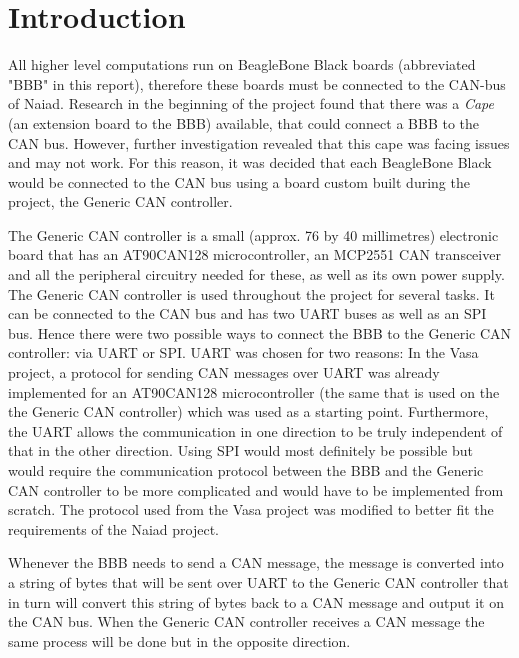 
\section{Introduction}\label{sec:introduction}
All higher level computations run on BeagleBone Black boards (abbreviated "BBB" in this report), therefore these boards must be connected to the CAN-bus of Naiad. Research in the beginning of the project found that there was a \emph{Cape} (an extension board to the BBB) available, that could connect a BBB to the CAN bus. However, further investigation revealed that this cape was facing issues and may not work. For this reason, it was decided that each BeagleBone Black would be connected to the CAN bus using a board custom built during the project, the Generic CAN controller. \newline

The Generic CAN controller is a small (approx. 76 by 40 millimetres) electronic board that has an AT90CAN128 microcontroller, an MCP2551 CAN transceiver and all the peripheral circuitry needed for these, as well as its own power supply. The Generic CAN controller is used throughout the project for several tasks. It can be connected to the CAN bus and has two UART buses as well as an SPI bus. \newline
Hence there were two possible ways to connect the BBB to the Generic CAN controller: via UART or SPI. \newline
UART was chosen for two reasons: In the Vasa project, a protocol for sending CAN messages over UART was already implemented for an AT90CAN128 microcontroller (the same that is used on the the Generic CAN controller) which was used as a starting point. Furthermore, the UART allows the communication in one direction to be truly independent of that in the other direction. Using SPI would most definitely be possible but would require the communication protocol between the BBB and the Generic CAN controller to be more complicated and would have to be implemented from scratch.  \newline
The protocol used from the Vasa project was modified to better fit the requirements of the Naiad project.

Whenever the BBB needs to send a CAN message, the message is converted into a string of bytes that will be sent over UART to the Generic CAN controller that in turn will convert this string of bytes back to a CAN message and output it on the CAN bus. When the Generic CAN controller receives a CAN message the same process will be done but in the opposite direction. 
